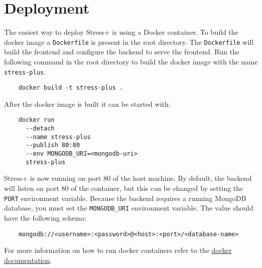 \section{Deployment}
\label{sec:deployment}

The easiest way to deploy Stress+ is using a Docker container.
To build the docker image a \texttt{Dockerfile} is present in the root directory. 
The \texttt{Dockerfile} will build the frontend and configure the backend to serve the frontend. 
Run the following command in the root directory to build the docker image with the name \texttt{stress-plus}.
\begin{verbatim}
    docker build -t stress-plus .
\end{verbatim}
After the docker image is built it can be started with:
\begin{verbatim}
    docker run 
      --detach 
      --name stress-plus 
      --publish 80:80 
      --env MONGODB_URI=<mongodb-uri> 
      stress-plus
\end{verbatim}
Stress+ is now running on port $80$ of the host machine.
By default, the backend will listen on port $80$ of the container, but this can be changed by setting the \texttt{PORT} environment variable.
Because the backend requires a running MongoDB database, you must set the \texttt{MONGODB\_URI} environment variable. 
The value should have the following schema:
\begin{verbatim}
    mongodb://<username>:<password>@<host>:<port>/<database-name>
\end{verbatim}

For more information on how to run docker containers refer to the \href{https://docs.docker.com/engine/reference/commandline/run}{docker documentation}.
